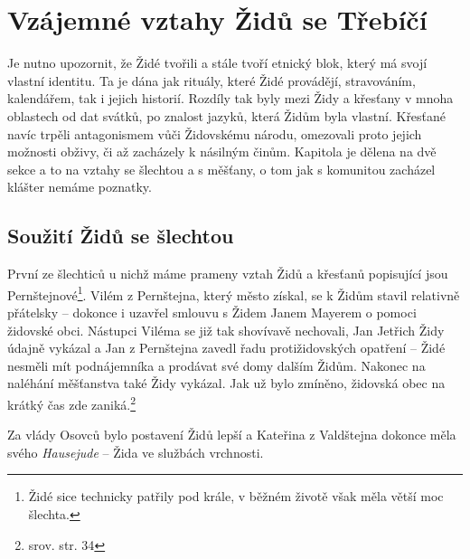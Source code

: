 \documentclass[a4paper,oneside,12pt]{report}
\begin{document}
\chapter{Vzájemné vztahy Židů se Třebíčí}

Je nutno upozornit, že Židé tvořili a stále tvoří etnický blok, který má svojí vlastní identitu.
Ta je dána jak rituály, které Židé provádějí, stravováním, kalendářem, tak i jejich historií.
Rozdíly tak byly mezi Židy a křesťany v mnoha oblastech od dat svátků, po znalost jazyků, která Židům byla vlastní.
Křesťané navíc trpěli antagonismem vůči Židovskému národu, omezovali proto jejich možnosti obživy, či až zacházely k násilným činům.
Kapitola je dělena na dvě sekce a to na vztahy se šlechtou a s měšťany, o tom jak s komunitou zacházel klášter nemáme poznatky.

\section{Soužití Židů se šlechtou}

První ze šlechticů u nichž máme prameny vztah Židů a křesťanů popisující jsou Pernštejnové\footnote{Židé sice technicky patřily pod krále, v běžném životě však měla větší moc šlechta.}.
Vilém z Pernštejna, který město získal, se k Židům stavil relativně přátelsky -- dokonce i uzavřel smlouvu s Židem Janem Mayerem o pomoci židovské obci.
Nástupci Viléma se již tak shovívavě nechovali, Jan Jetřich Židy údajně vykázal a Jan z Pernštejna zavedl řadu protižidovských opatření -- Židé nesměli mít podnájemníka a prodávat své domy dalším Židům.
Nakonec na naléhání měšťanstva také Židy vykázal.
Jak už bylo zmíněno, židovská obec na krátký čas zde zaniká.\footnote{srov. \cite{Fiser2005} str. 34}

Za vlády Osovců bylo postavení Židů lepší a Kateřina z Valdštejna dokonce měla svého \textit{Hausejude} -- Žida ve službách vrchnosti.
\end{document}
